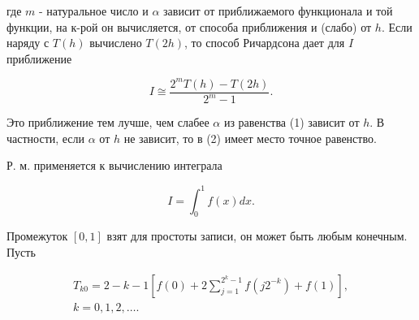 \documentclass[10pt]{article}
\begin{document}
где $m$ - натуральное число и $\alpha$ зависит от приближаемого функционала и той функции, на к-рой он вычисляется, от способа приближения и (слабо) от $h$. Если наряду с $T(h)$ вычислено $T(2 h)$, то способ Ричардсона дает для $I$ приближение



\[

I \cong \frac{2^{m} T(h)-T(2 h)}{2^{m}-1} .

\]



Это приближение тем лучше, чем слабее $\alpha$ из равенства (1) зависит от $h$. В частности, если $\alpha$ от $h$ не зависит, то в (2) имеет место точное равенство.



Р. м. применяется к вычислению интеграла



\[

I=\int_{0}^{1} f(x) d x .

\]



Промежуток $[0,1]$ взят для простоты записи, он может быть любым конечным. Пусть



\[

\begin{gathered}

T_{k 0}=2-k-1\left[f(0)+2 \sum_{j=1}^{2^{k}-1} f\left(j 2^{-k}\right)+f(1)\right], \\

k=0,1,2, \ldots .

\end{gathered}

\]
\end{document}
